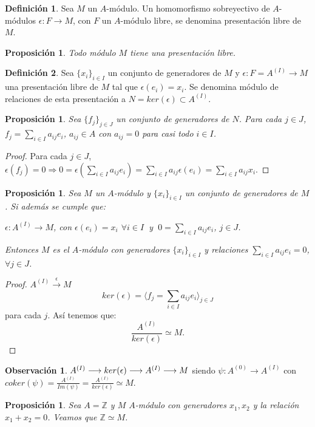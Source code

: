 \documentclass{article}
\theoremstyle{theorem-style}  %
\newtheorem{proposition}[theorem]{Proposición}
\theoremstyle{definition}
\newtheorem{definition}{Definición}[section]
\newtheorem*{observation}{Observación} %
\theoremstyle{example-style}
\begin{document}
	\begin{definition}
		Sea $M$ un $A$-módulo. Un homomorfismo sobreyectivo de $A$-módulos $\epsilon : F \longrightarrow M$, con $F$ un $A$-módulo libre, se denomina presentación libre de $M$.
	\end{definition}
	\begin{proposition}
		Todo módulo $M$ tiene una presentación libre.
	\end{proposition}
	\begin{definition}
		Sea $\{x_i\}_{i\in I}$ un conjunto de generadores de $M$ y $\epsilon : F = A^{(I)} \longrightarrow M$ una presentación libre de $M$ tal que $\epsilon (e_i) = x_i$. Se denomina módulo de relaciones de esta presentación a $N = ker(\epsilon) \subset A^{(I)}$.
	\end{definition}
	\begin{proposition}
		Sea $\{f_j\}_{j\in J}$ un conjunto de generadores de $N$. Para cada $j\in J$, $f_j = \sum_{i\in I} a_{ij}e_i$, $a_{ij}\in A$ con $a_{ij} = 0$ para casi todo $i\in I$.
	\end{proposition}
	\begin{proof}
		Para cada $j\in J$, $\epsilon (f_j) = 0 \Rightarrow 0 = \epsilon (\sum_{i\in I} a_{ij}e_i) = \sum_{i\in I} a_{ij} \epsilon (e_i) = \sum_{i\in I} a_{ij} x_i$.
	\end{proof}
	\begin{proposition}
		Sea $M$ un $A$-módulo y $\{x_i\}_{i\in I}$ un conjunto de generadores de $M$. Si además se cumple que:
		\begin{center}
			$\epsilon : A^{(I)} \longrightarrow M$, con $\epsilon (e_i) = x_i$ $\forall i\in I$  $\ $y$\ $  $0 = \sum_{i\in I} a_{ij}e_i$, $j\in J$.
		\end{center}
		Entonces $M$ es el $A$-módulo con generadores $\{x_i\}_{i\in I}$ y relaciones $\sum_{i\in I} a_{ij}e_i = 0$, $\forall j\in J$.
	\end{proposition}
	\begin{proof}
		$A^{(I)} \stackrel{\epsilon}{\longrightarrow} M$
		\[ker(\epsilon) = \langle f_j = \sum_{i\in I} a_{ij}e_i\rangle_{j\in J}\]
		para cada $j$. Así tenemos que:
		\[\frac{A^{(I)}}{ker(\epsilon)}\simeq M.\]
	\end{proof}
	\begin{observation}
		$A^{(I)} \longrightarrow ker(\epsilon) \longrightarrow A^{(I)} \longrightarrow M \\$
		siendo $\psi: A^{(0)} \longrightarrow A^{(I)}$ con $coker(\psi) = \frac{A^{(I)}}{Im(\psi)} = \frac{A^{(I)}}{ker(\epsilon)} \simeq M$.
	\end{observation}
	\begin{proposition}
		Sea $A=\mathbb{Z}$ y $M$ $A$-módulo con generadores $x_1,x_2$ y la relación $x_1+x_2=0$. Veamos que $\mathbb{Z}\simeq M$.
	\end{proposition}
\end{document}

